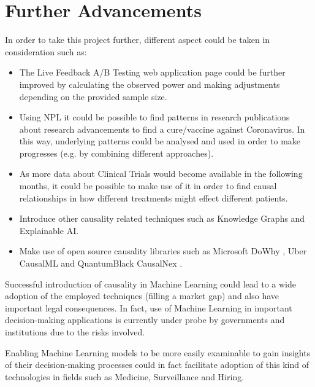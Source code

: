 \section{Further Advancements}

In order to take this project further, different aspect could be taken in consideration such as:
\vspace{-0.2cm}
\begin{itemize}
    \item The Live Feedback A/B Testing web application page could be further improved by calculating the observed power and making adjustments depending on the provided sample size.
    \item Using NPL it could be possible to find patterns in research publications about research advancements to find a cure/vaccine against Coronavirus. In this way, underlying patterns could be analysed and used in order to make progresses (e.g. by combining different approaches).
    \item As more data about Clinical Trials would become available in the following months, it could be possible to make use of it in order to find causal relationships in how different treatments might effect different patients. 
    \item Introduce other causality related techniques such as Knowledge Graphs and Explainable AI. 
    \item Make use of open source causality libraries such as Microsoft DoWhy \cite{dowhy}, Uber CausalML \cite{causalml} and QuantumBlack CausalNex \cite{causalnex}. 
\end{itemize}
\vspace{-0.2cm}
Successful introduction of causality in Machine Learning could lead to a wide adoption of the employed techniques (filling a market gap) and also have important legal consequences. In fact, use of Machine Learning in important decision-making applications is currently under probe by governments and institutions due to the risks involved.

Enabling Machine Learning models to be more easily examinable to gain insights of their decision-making processes could in fact facilitate adoption of this kind of technologies in fields such as Medicine, Surveillance and Hiring.